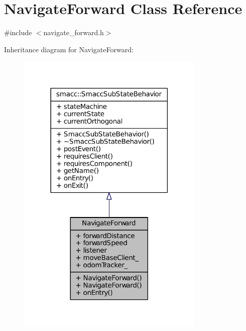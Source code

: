\hypertarget{classNavigateForward}{}\section{Navigate\+Forward Class Reference}
\label{classNavigateForward}


{\ttfamily \#include $<$navigate\+\_\+forward.\+h$>$}



Inheritance diagram for Navigate\+Forward\+:
\nopagebreak
\begin{figure}[H]
\begin{center}
\leavevmode
\includegraphics[width=254pt]{classNavigateForward__inherit__graph}
\end{center}
\end{figure}


